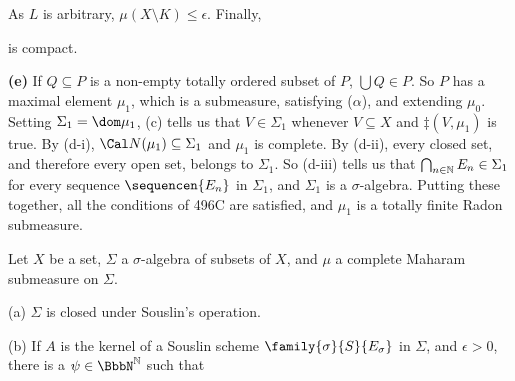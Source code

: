 {\noindent As $L$ is arbitrary, $\mu(X\setminus K)\le\epsilon$.   Finally,


\noindent is compact.\ \Qed

\medskip

{\bf (e)} If $Q\subseteq P$ is a non-empty totally ordered subset of $P$,
$\bigcup Q\in P$.   So $P$ has a maximal element $\mu_1$,
which is a submeasure,
satisfying ($\alpha$), and extending $\mu_0$.
Setting $\Sigma_1=\dom\mu_1$, (c) tells us that $V\in\Sigma_1$ whenever
$V\subseteq X$ and $\ddagger(V,\mu_1)$ is true.   By (d-i),
$\Cal N(\mu_1)\subseteq\Sigma_1$ and $\mu_1$ is complete.   By (d-ii),
every closed set, and therefore every open set, belongs to $\Sigma_1$.
So (d-iii) tells us that
$\bigcap_{n\in\Bbb N}E_n\in\Sigma_1$ for every sequence $\sequencen{E_n}$
in $\Sigma_1$, and $\Sigma_1$ is a $\sigma$-algebra.   Putting these
together, all the conditions of 496C are satisfied, and $\mu_1$ is a totally finite Radon
submeasure.
}%

 Let $X$ be a set, $\Sigma$ a $\sigma$-algebra of
subsets of $X$, and $\mu$ a complete Maharam submeasure on
$\Sigma$.

(a) $\Sigma$ is closed under Souslin's operation.

(b) If $A$ is the kernel of a Souslin scheme
$\family{\sigma}{S}{E_{\sigma}}$ in $\Sigma$, and $\epsilon>0$, there is a
$\psi\in\NN$ such that



